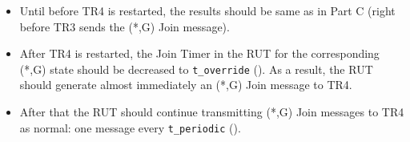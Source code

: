\documentclass[11pt]{report}
\begin{document}

\begin{itemize}

  \item Until before TR4 is restarted, the results should
  be same as in Part C (right before TR3 sends the (*,G) Join message).

  \item After TR4 is restarted,
  the Join Timer in the RUT for the corresponding (*,G) state
  should be decreased to \verb=t_override= ({\PimsmTOverride}). As a result,
  the RUT should generate almost immediately an (*,G) Join message to TR4.

  \item After that the RUT should continue transmitting 
  (*,G) Join messages to TR4 as normal: one message every \verb=t_periodic=
  ({\PimsmTPeriodic}).

\end{itemize}

\end{document}
